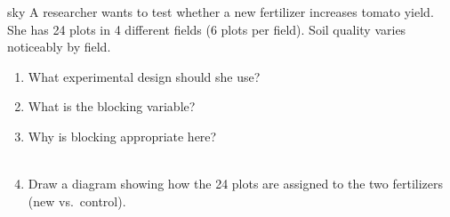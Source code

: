 \documentclass[10pt]{article}
\begin{document}
\namedateperiod

\vspace{0.14in}

\begin{scenariobox}[Context]{sky}
\small
A researcher wants to test whether a new fertilizer increases tomato yield. She has
24 plots in 4 different fields (6 plots per field). Soil quality varies noticeably
by field.
\end{scenariobox}

\vspace{0.1in}

\begin{practicebox}
\small
\begin{enumerate}[leftmargin=1.5em, itemsep=10pt]
  \item What experimental design should she use? \blank{6cm}

  \item What is the blocking variable? \blank{6cm}

  \item Why is blocking appropriate here?\\
        \writeline\\[1pt]\writeline

  \item Draw a diagram showing how the 24 plots are assigned to the two fertilizers
        (new vs.\ control).

  \vspace{1.6in}
\end{enumerate}
\end{practicebox}
\end{document}
